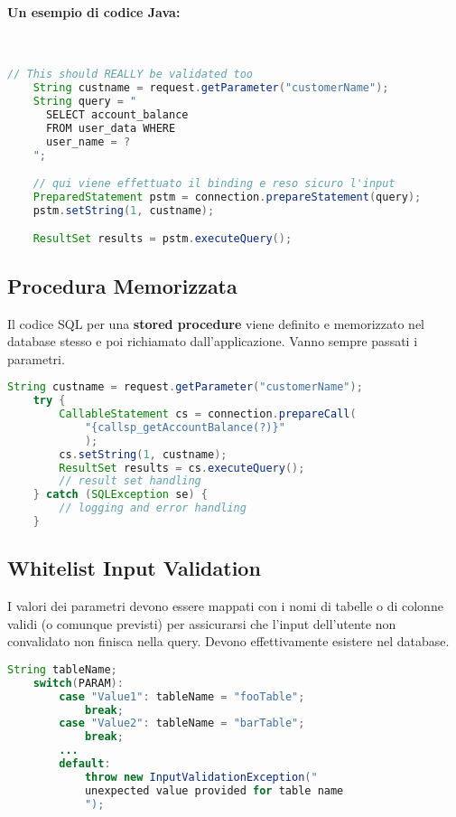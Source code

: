 \paragraph{Un esempio di codice Java:} \

\begin{lstlisting}[language=Java]
    // This should REALLY be validated too
    String custname = request.getParameter("customerName");
    String query = "
      SELECT account_balance 
      FROM user_data WHERE
      user_name = ? 
    ";

    // qui viene effettuato il binding e reso sicuro l'input
    PreparedStatement pstm = connection.prepareStatement(query);
    pstm.setString(1, custname);

    ResultSet results = pstm.executeQuery();
\end{lstlisting}

\subsection{Procedura Memorizzata}

Il codice SQL per una \textbf{stored procedure} viene definito e memorizzato nel
database stesso e
poi richiamato dall'applicazione. Vanno sempre passati i parametri.

\begin{lstlisting}[language=Java, caption=Esempio di codice Java che
    sfrutta una \textit{stored procedure}]
    String custname = request.getParameter("customerName");
    try {
        CallableStatement cs = connection.prepareCall(
            "{callsp_getAccountBalance(?)}"
            );
        cs.setString(1, custname);
        ResultSet results = cs.executeQuery();
        // result set handling
    } catch (SQLException se) {
        // logging and error handling
    }
\end{lstlisting}

\subsection{Whitelist Input Validation}

I valori dei parametri devono essere mappati con i nomi di tabelle o di colonne
validi (o comunque previsti) per assicurarsi che l'input dell'utente non
convalidato non finisca nella
query. Devono effettivamente esistere nel database.

\begin{lstlisting}[language=Java, caption=Esempio di codic Java che effettua 
    input validation tramite whitelist.]
    String tableName;
    switch(PARAM):
        case "Value1": tableName = "fooTable";
            break;
        case "Value2": tableName = "barTable";
            break;
        ...
        default: 
            throw new InputValidationException("
            unexpected value provided for table name
            ");
\end{lstlisting}

